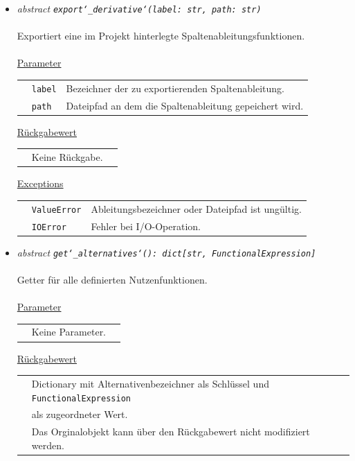 \documentclass{article}
\begin{document}
\begin{itemize}
\item \textit{\flqq{}abstract\frqq} \texttt{\textit{export\char`_derivative\char`(label: str, path: str)}}\\\\
Exportiert eine im Projekt hinterlegte Spaltenableitungsfunktionen.
\\\\
\underline{Parameter}\\
\begin{tabular}{lll}
 & \texttt{label} & Bezeichner der zu exportierenden Spaltenableitung.\\
 & \texttt{path} & Dateipfad an dem die Spaltenableitung gepeichert wird.\\
\end{tabular}

\underline{Rückgabewert}\\
\begin{tabular}{lll}
 & Keine Rückgabe.\\
\end{tabular}

\underline{Exceptions}\\
\begin{tabular}{lll}
 & \texttt{ValueError} & Ableitungsbezeichner oder Dateipfad ist ungültig.\\
 & \texttt{IOError} & Fehler bei I/O-Operation.\\
\end{tabular}


\item \textit{\flqq{}abstract\frqq} \texttt{\textit{get\char`_alternatives\char`(): dict[str, FunctionalExpression]}}\\\\
Getter für alle definierten Nutzenfunktionen.
\\\\
\underline{Parameter}\\
\begin{tabular}{lll}
 & Keine Parameter.\\
\end{tabular}

\underline{Rückgabewert}\\
\begin{tabular}{lll}
 & Dictionary mit Alternativenbezeichner als Schlüssel und \texttt{FunctionalExpression}\\
 & als zugeordneter Wert.\\
 & Das Orginalobjekt kann über den Rückgabewert nicht modifiziert werden.\\
\end{tabular}



\end{itemize}
\end{document}
